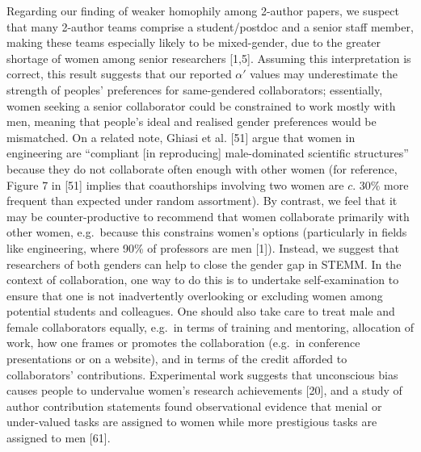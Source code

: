 \documentclass[12pt,]{article}
\begin{document}
Regarding our finding of weaker homophily among 2-author papers, we
suspect that many 2-author teams comprise a student/postdoc and a senior
staff member, making these teams especially likely to be mixed-gender,
due to the greater shortage of women among senior researchers {[}1,5{]}.
Assuming this interpretation is correct, this result suggests that our
reported \(\alpha'\) values may underestimate the strength of peoples'
preferences for same-gendered collaborators; essentially, women seeking
a senior collaborator could be constrained to work mostly with men,
meaning that people's ideal and realised gender preferences would be
mismatched. On a related note, Ghiasi et al. {[}51{]} argue that women
in engineering are ``compliant {[}in reproducing{]} male-dominated
scientific structures'' because they do not collaborate often enough
with other women (for reference, Figure 7 in {[}51{]} implies that
coauthorships involving two women are \(c\). 30\% more frequent than
expected under random assortment). By contrast, we feel that it may be
counter-productive to recommend that women collaborate primarily with
other women, e.g.~because this constrains women's options (particularly
in fields like engineering, where 90\% of professors are men {[}1{]}).
Instead, we suggest that researchers of both genders can help to close
the gender gap in STEMM. In the context of collaboration, one way to do
this is to undertake self-examination to ensure that one is not
inadvertently overlooking or excluding women among potential students
and colleagues. One should also take care to treat male and female
collaborators equally, e.g.~in terms of training and mentoring,
allocation of work, how one frames or promotes the collaboration
(e.g.~in conference presentations or on a website), and in terms of the
credit afforded to collaborators' contributions. Experimental work
suggests that unconscious bias causes people to undervalue women's
research achievements {[}20{]}, and a study of author contribution
statements found observational evidence that menial or under-valued
tasks are assigned to women while more prestigious tasks are assigned to
men {[}61{]}.
\end{document}
